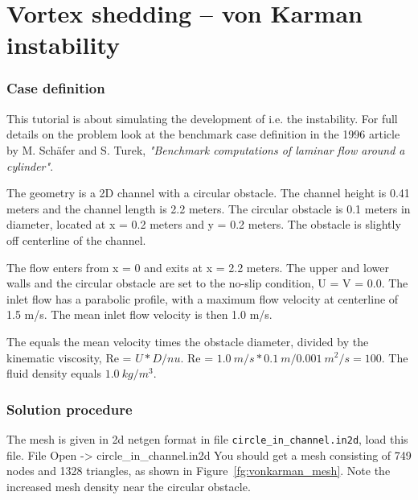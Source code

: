 \chapter{Vortex shedding -- von Karman instability}


\subsection*{Case definition}

This tutorial is about simulating the development of  i.e. the  instability. 
For full details on the problem look at the benchmark case definition in the 1996 article
by M. Sch{\"a}fer and S. Turek, \textit{"Benchmark computations of laminar flow around a cylinder"}.

The geometry is a 2D channel with a circular obstacle.  The channel height is 0.41 meters and the channel length is 2.2 meters.  The circular obstacle is 0.1 meters in diameter, located at x = 0.2 meters
and y = 0.2 meters.  The obstacle is slightly off centerline of the channel.

The flow enters from x = 0 and exits at x = 2.2 meters.   The upper and lower walls and the circular obstacle are set to the no-slip condition, U = V = 0.0.  The inlet flow has a parabolic profile, with a maximum flow velocity at centerline of 1.5 m/s.  The mean inlet flow velocity is then 1.0 m/s.

The  equals the mean velocity times the obstacle diameter, divided by the
kinematic viscosity, Re = $U*D / nu$.  Re = $1.0~m/s * 0.1~m / 0.001~m^2/s = 100$.  
The fluid density equals $1.0~kg/m^3$.

\subsection*{Solution procedure}

The mesh is given in 2d netgen format in file \texttt{circle\_in\_channel.in2d}, load this file.
\ttbegin
File 
  Open -> circle_in_channel.in2d
\ttend
You should get a mesh consisting of 749 nodes and 1328 triangles,
as shown in Figure~\ref{fg:vonkarman_mesh}.  Note the increased mesh density near the
circular obstacle.

